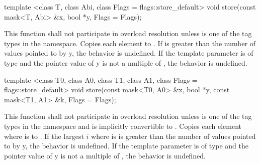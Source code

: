 \begin{itemdecl}
template <class T, class Abi, class Flags = flags::store_default>
void store(const mask<T, Abi> &x, bool *y, Flags = Flags{});
\end{itemdecl}
\begin{itemdescr}
  \pnum\remarks This function shall not participate in overload resolution unless  is one of the tag types in the  namespace.
  \pnum\effects Copies each element  to  \foralli.
  \pnum\remarks If \mask[<T, Abi>] is greater than the number of values pointed to by \code y, the behavior is undefined.
  \pnum\remarks If the  template parameter is of type  and the pointer value of \code y is not a multiple of , the behavior is undefined.
\end{itemdescr}

\begin{itemdecl}
template <class T0, class A0, class T1, class A1, class Flags = flags::store_default>
void store(const mask<T0, A0> &x, bool *y, const mask<T1, A1> &k, Flags = Flags{});
\end{itemdecl}
\begin{itemdescr}
  \pnum\remarks This function shall not participate in overload resolution unless  is one of the tag types in the  namespace and \mask[<T1, A1>] is implicitly convertible to \mask[<T0, A0>].
  \pnum\effects Copies each element  where  is \true to  \foralli.
  \pnum\remarks If the largest $i$ where  is \true is greater than the number of values pointed to by \code y, the behavior is undefined.
  \pnum\remarks If the  template parameter is of type  and the pointer value of \code y is not a multiple of , the behavior is undefined.
\end{itemdescr}


